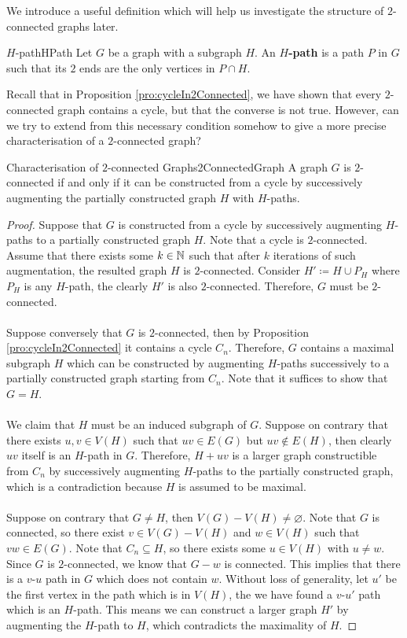 \documentclass[math, code]{amznotes}
\theoremstyle{remark}
\begin{document}
We introduce a useful definition which will help us investigate the structure of $2$-connected graphs later.
\begin{dfnbox}{$H$-path}{HPath}
    Let $G$ be a graph with a subgraph $H$. An {\color{red} \textbf{$H$-path}} is a path $P$ in $G$ such that its $2$ ends are the only vertices in $P \cap H$.
\end{dfnbox}
Recall that in Proposition \ref{pro:cycleIn2Connected}, we have shown that every $2$-connected graph contains a cycle, but that the converse is not true. However, can we try to extend from this necessary condition somehow to give a more precise characterisation of a $2$-connected graph?
\begin{thmbox}{Characterisation of $2$-connected Graphs}{2ConnectedGraph}
    A graph $G$ is $2$-connected if and only if it can be constructed from a cycle by successively augmenting the partially constructed graph $H$ with $H$-paths.
    \tcblower
    \begin{proof}
        Suppose that $G$ is constructed from a cycle by successively augmenting $H$-paths to a partially constructed graph $H$. Note that a cycle is $2$-connected. Assume that there exists some $k \in \mathbb{N}$ such that after $k$ iterations of such augmentation, the resulted graph $H$ is $2$-connected. Consider $H' \coloneqq H \cup P_H$ where $P_H$ is any $H$-path, the clearly $H'$ is also $2$-connected. Therefore, $G$ must be $2$-connected.
        \\\\
        Suppose conversely that $G$ is $2$-connected, then by Proposition \ref{pro:cycleIn2Connected} it contains a cycle $C_n$. Therefore, $G$ contains a maximal subgraph $H$ which can be constructed by augmenting $H$-paths successively to a partially constructed graph starting from $C_n$. Note that it suffices to show that $G = H$.
        \\\\
        We claim that $H$ must be an induced subgraph of $G$. Suppose on contrary that there exists $u, v \in V(H)$ such that $uv \in E(G)$ but $uv \notin E(H)$, then clearly $uv$ itself is an $H$-path in $G$. Therefore, $H + uv$ is a larger graph constructible from $C_n$ by successively augmenting $H$-paths to the partially constructed graph, which is a contradiction because $H$ is assumed to be maximal.
        \\\\
        Suppose on contrary that $G \neq H$, then $V(G) - V(H) \neq \varnothing$. Note that $G$ is connected, so there exist $v \in V(G) - V(H)$ and $w \in V(H)$ such that $vw \in E(G)$. Note that $C_n \subseteq H$, so there exists some $u \in V(H)$ with $u \neq w$. Since $G$ is $2$-connected, we know that $G - w$ is connected. This implies that there is a $v$-$u$ path in $G$ which does not contain $w$. Without loss of generality, let $u'$ be the first vertex in the path which is in $V(H)$, the we have found a $v$-$u'$ path which is an $H$-path. This means we can construct a larger graph $H'$ by augmenting the $H$-path to $H$, which contradicts the maximality of $H$.
    \end{proof}
\end{thmbox}
\end{document}
